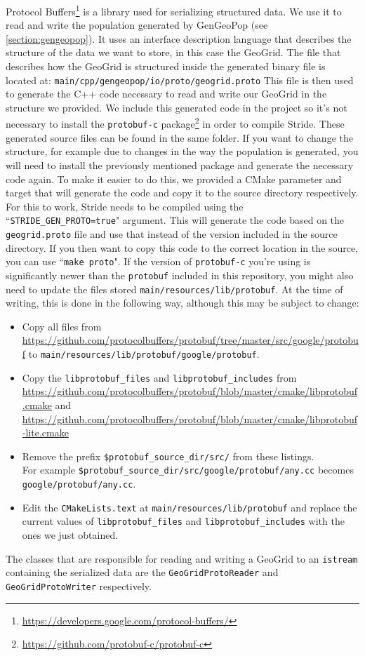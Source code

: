 Protocol Buffers\footnote{\url{https://developers.google.com/protocol-buffers/}} is a library used for serializing structured data.
We use it to read and write the population generated by GenGeoPop (see \ref{section:gengeopop}).
It uses an interface description language that describes the structure of the data we want to store, in this case the GeoGrid.
The file that describes how the GeoGrid is structured inside the generated binary file is located at:
\texttt{main/cpp/gengeopop/io/proto/geogrid.proto}
This file is then used to generate the C++ code necessary to read and write our GeoGrid in the structure we provided.
We include this generated code in the project so it's not necessary to install the \texttt{protobuf-c} package\footnote{\url{https://github.com/protobuf-c/protobuf-c}} in order to compile Stride.
These generated source files can be found in the same folder.
If you want to change the structure, for example due to changes in the way the population is generated, you will need to install the previously mentioned package and generate the necessary code again.
To make it easier to do this, we provided a CMake parameter and target that will generate the code and copy it to the source directory respectively.
For this to work, Stride needs to be compiled using the ``\texttt{STRIDE\_GEN\_PROTO=true}" argument.
This will generate the code based on the \texttt{geogrid.proto} file and use that instead of the version included in the source directory.
If you then want to copy this code to the correct location in the source, you can use ``\texttt{make proto}".
If the version of \texttt{protobuf-c} you're using is significantly newer than the \texttt{protobuf} included in this repository, you might also need to update the files stored \texttt{main/resources/lib/protobuf}.
At the time of writing, this is done in the following way, although this may be subject to change:
\begin{itemize}
    \item Copy all files from \url{https://github.com/protocolbuffers/protobuf/tree/master/src/google/protobuf} to \texttt{main/resources/lib/protobuf/google/protobuf}.
    \item Copy the \texttt{libprotobuf\_files} and \texttt{libprotobuf\_includes} from \url{https://github.com/protocolbuffers/protobuf/blob/master/cmake/libprotobuf.cmake} and \url{https://github.com/protocolbuffers/protobuf/blob/master/cmake/libprotobuf-lite.cmake}
    \item Remove the prefix \texttt{\${protobuf\_source\_dir}/src/} from these listings.\\
        For example \texttt{\${protobuf\_source\_dir}/src/google/protobuf/any.cc} becomes \texttt{google/protobuf/any.cc}.
    \item Edit the \texttt{CMakeLists.text} at \texttt{main/resources/lib/protobuf} and replace the current values of \texttt{libprotobuf\_files} and \texttt{libprotobuf\_includes} with the ones we just obtained.
\end{itemize}

The classes that are responsible for reading and writing a GeoGrid to an \texttt{istream} containing the serialized data are the \texttt{GeoGridProtoReader} and \texttt{GeoGridProtoWriter} respectively.
